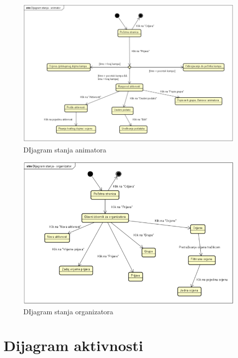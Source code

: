 \begin{figure}[H]
	\includegraphics[scale=0.9]{dokumentacija/dijagrami/state-animator.PNG} 
	\centering
	\caption{DIjagram stanja animatora}
	\label{fig:promjene}
\end{figure}

\begin{figure}[H]
	\includegraphics[scale=0.9]{dokumentacija/dijagrami/state-organizator.PNG} 
	\centering
	\caption{DIjagram stanja organizatora}
	\label{fig:promjene}
\end{figure}

\eject

\section{Dijagram aktivnosti}

